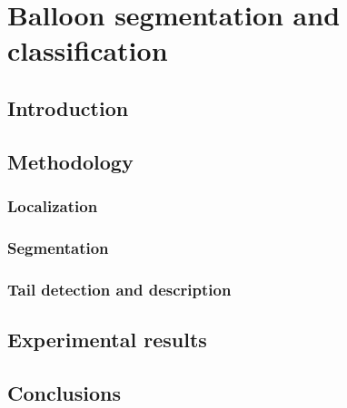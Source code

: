 \chapter{Balloon segmentation and classification}
\label{chap:balloon_segmentation_and_classification}
\graphicspath{{./chapters/6-be/figs/}}

\section{Introduction}


\section{Methodology}

\subsection{Localization} %
\label{sub:localization}


\subsection{Segmentation} %
\label{sub:segmentation}


\subsection{Tail detection and description} %
\label{sub:tail_detection_and_description}


\section{Experimental results}


\section{Conclusions}
